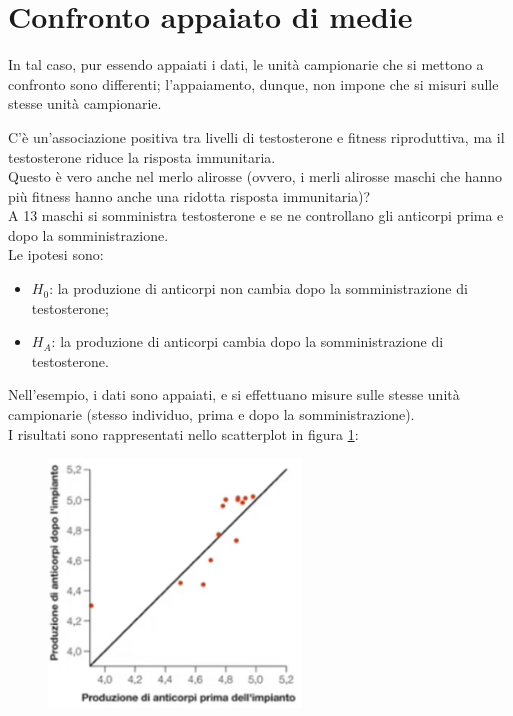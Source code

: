 \documentclass[10pt, draft]{book}
\newcounter{example}[section]
\begin{document}
\section{Confronto appaiato di medie}

In tal caso, pur essendo appaiati i dati, le unità campionarie che si mettono a confronto sono differenti; l'appaiamento, dunque, non impone che si misuri sulle stesse unità campionarie.
\begin{example}\label{esmerlo}
    C'è un'associazione positiva tra livelli di testosterone e fitness riproduttiva, ma il testosterone riduce la risposta immunitaria.
    \\
    Questo è vero anche nel merlo alirosse (ovvero, i merli alirosse maschi che hanno più fitness hanno anche una ridotta risposta immunitaria)?
    \\
    A 13 maschi si somministra testosterone e se ne controllano gli anticorpi prima e dopo la somministrazione.
    \\
    Le ipotesi sono:
    \begin{itemize}
        \item $H_0$: la produzione di anticorpi non cambia dopo la somministrazione di testosterone;
        \item $H_A$: la produzione di anticorpi cambia dopo la somministrazione di testosterone.
    \end{itemize}
    Nell'esempio, i dati sono appaiati, e si effettuano misure sulle stesse unità campionarie (stesso individuo, prima e dopo la somministrazione).
    \\
    I risultati sono rappresentati nello scatterplot in figura \ref{fig12.2-1}:
    \begin{figure}[H]\label{fig12.2-1}
        \centering
        \includegraphics[width=0.6\textwidth]{fig12.2-1}

\end{figure}
\end{example}
\end{document}
